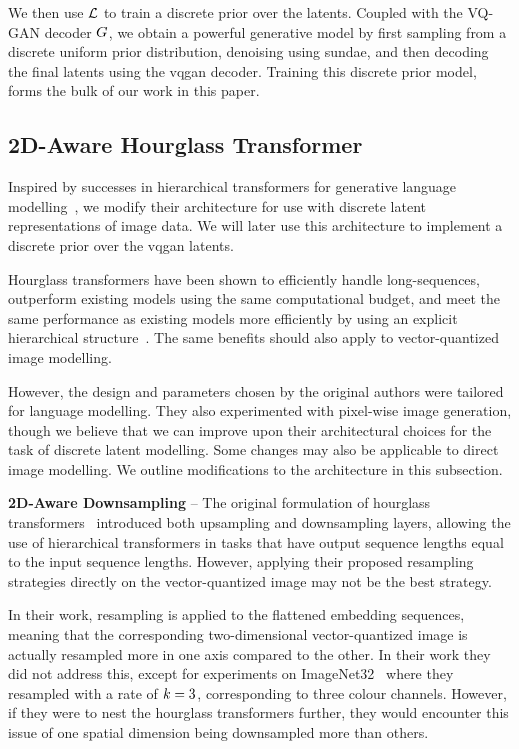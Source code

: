 We then use $\mathcal{L}$ to train a discrete prior over the latents. Coupled
with the VQ-GAN decoder $G$, we obtain a powerful generative model
by first sampling from a discrete uniform prior distribution, denoising using
\gls{sundae}, and then decoding the final latents using the \gls{vqgan} decoder.
Training this discrete prior model, forms the bulk of our work in this paper.

\subsection{2D-Aware Hourglass Transformer}
Inspired by successes in hierarchical transformers for generative language
modelling~\cite{nawrot2021hierarchical}, we modify their architecture for use
with discrete latent representations of image data. We will later use this
architecture to implement a discrete prior over the \gls{vqgan} latents. 

Hourglass transformers have been shown to efficiently handle long-sequences,
outperform existing models using the same computational budget, and meet the
same performance as existing models more efficiently by using an explicit
hierarchical structure~\cite{nawrot2021hierarchical}. The same benefits should
also apply to vector-quantized image modelling. 

However, the design and parameters chosen by the original authors were tailored
for language modelling. They also experimented with pixel-wise image
generation, though we believe that we can improve upon their architectural
choices for the task of discrete latent modelling. Some changes may also be
applicable to direct image modelling. We outline modifications to the
architecture in this subsection.

\textbf{2D-Aware Downsampling} -- The original formulation of hourglass
transformers~\cite{nawrot2021hierarchical} introduced both upsampling and
downsampling layers, allowing the use of hierarchical transformers in tasks that
have output sequence lengths equal to the input sequence lengths. However,
applying their proposed resampling strategies directly on the vector-quantized
image may not be the best strategy. 

In their work, resampling is applied to the flattened embedding sequences,
meaning that the corresponding two-dimensional vector-quantized image is
actually resampled more in one axis compared to the other. In their work they
did not address this, except for experiments on
ImageNet32~\cite{russakovsky2015imagenet} where they resampled with a rate of
$k=3$, corresponding to three colour channels. However, if they
were to nest the hourglass transformers further, they would encounter this issue
of one spatial dimension being downsampled more than others.

